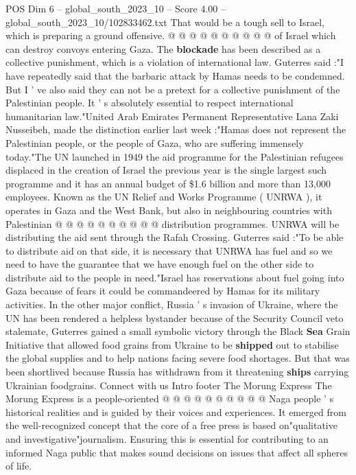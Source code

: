 \begin{textsample}{POS Dim 6 – global\_south\_2023\_10 – Score 4.00 – global\_south\_2023\_10/102833462.txt}
That would be a tough sell to Israel, which is preparing a ground offensive. @ @ @ @ @ @ @ @ @ @ of Israel which can destroy convoys entering Gaza.
The \textbf{blockade} has been described as a collective punishment, which is a violation of international law.
Guterres said :"I have repeatedly said that the barbaric attack by Hamas needs to be condemned.
But I ' ve also said they can not be a pretext for a collective punishment of the Palestinian people.
It ' s absolutely essential to respect international humanitarian law."United Arab Emirates Permanent Representative Lana Zaki Nusseibeh, made the distinction earlier last week :"Hamas does not represent the Palestinian people, or the people of Gaza, who are suffering immensely today."The UN launched in 1949 the aid programme for the Palestinian refugees displaced in the creation of Israel the previous year is the single largest such programme and it has an annual budget of \$1.6 billion and more than 13,000 employees.
Known as the UN Relief and Works Programme ( UNRWA ), it operates in Gaza and the West Bank, but also in neighbouring countries with Palestinian @ @ @ @ @ @ @ @ @ @ distribution programmes.
UNRWA will be distributing the aid sent through the Rafah Crossing.
Guterres said :"To be able to distribute aid on that side, it is necessary that UNRWA has fuel and so we need to have the guarantee that we have enough fuel on the other side to distribute aid to the people in need."Israel has reservations about fuel going into Gaza because of fears it could be commandeered by Hamas for its military activities.
In the other major conflict, Russia ' s invasion of Ukraine, where the UN has been rendered a helpless bystander because of the Security Council veto stalemate, Guterres gained a small symbolic victory through the Black \textbf{Sea} Grain Initiative that allowed food grains from Ukraine to be \textbf{shipped} out to stabilise the global supplies and to help nations facing severe food shortages.
But that was been shortlived because Russia has withdrawn from it threatening \textbf{ships} carrying Ukrainian foodgrains.
Connect with us Intro footer The Morung Express The Morung Express is a people-oriented @ @ @ @ @ @ @ @ @ @ Naga people ' s historical realities and is guided by their voices and experiences.
It emerged from the well-recognized concept that the core of a free press is based on"qualitative and investigative"journalism.
Ensuring this is essential for contributing to an informed Naga public that makes sound decisions on issues that affect all spheres of life.

\end{textsample}

